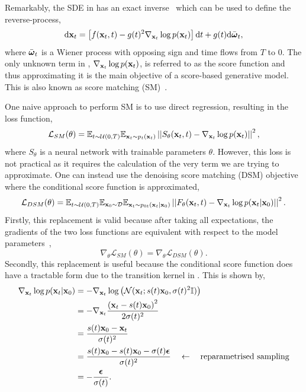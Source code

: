Remarkably, the SDE in  has an exact inverse~\cite{ReversetimeDiffusionEquation} which can be used to define the reverse-process,
\begin{equation}
    \label{eq:reverse_sde}
    \mathrm{d} \mathbf{x}_t = \left[ f(\mathbf{x}_t, t) - g(t)^2 \nabla_{\mathbf{x}_t} \log p(\mathbf{x}_t) \right] \mathrm{d} t + g(t) \mathrm{d} \bar{\boldsymbol{\omega}}_t,
\end{equation}
where $\bar{\boldsymbol{\omega}}_t$ is a Wiener process with opposing sign and time flows from $T$ to $0$.
The only unknown term in , $\nabla_{\mathbf{x}_t} \log p(\mathbf{x}_t)$, is referred to as the score function and thus approximating it is the main objective of a score-based generative model.
This is also known as score matching (SM)~\cite{ScoreMatching}.

One naive approach to perform SM is to use direct regression, resulting in the loss function,
\begin{equation}
    \label{eq:naive_loss}
    \mathcal{L}_{SM}(\theta) =
    \mathbb{E}_{t \sim \mathcal{U}(0, T)}
    \mathbb{E}_{\mathbf{x}_t \sim p_t(\mathbf{x}_t)}
    \left|\left|S_\theta(\mathbf{x}_t, t) - \nabla_{\mathbf{x}_t} \log p(\mathbf{x}_t)\right|\right|^2,
\end{equation}
where $S_\theta$ is a neural network with trainable parameters $\theta$.
However, this loss is not practical as it requires the calculation of the very term we are trying to approximate.
One can instead use the denoising score matching (DSM) objective~\cite{ScoreMatching, SlicedScoreMatching} where the conditional score function is approximated,
\begin{equation}
    \label{eq:denoising_loss}
    \mathcal{L}_{DSM}(\theta) =
    \mathbb{E}_{t \sim \mathcal{U}(0, T)}
    \mathbb{E}_{\mathbf{x}_0 \sim \mathcal{D}}
    \mathbb{E}_{\mathbf{x}_t \sim p_{0t}(\mathbf{x}_t|\mathbf{x}_0)}
    \left|\left|F_\theta(\mathbf{x}_t, t) - \nabla_{\mathbf{x}_t} \log p(\mathbf{x}_t|\mathbf{x}_0)\right|\right|^2.
\end{equation}
Firstly, this replacement is valid because after taking all expectations, the gradients of the two loss functions are equivalent with respect to the model parameters~\cite{ScoreBasedGenerativeModeling},
\begin{equation}
    \nabla_{\theta} \mathcal{L}_{SM}(\theta) = \nabla_{\theta} \mathcal{L}_{DSM}(\theta).
\end{equation}
Secondly, this replacement is useful because the conditional score function does have a tractable form due to the transition kernel in .
This is shown by,
\begin{equation}
    \begin{aligned}
        \label{eq:conditional_score}
        \nabla_{\mathbf{x}_t} \log p(\mathbf{x}_t|\mathbf{x}_0)
        &= -\nabla_{\mathbf{x}_t} \log \left( \mathcal{N}(\mathbf{x}_t; s(t)\mathbf{x}_0, \sigma(t)^2 \mathbb{I}) \right) \\
        &= -\nabla_{\mathbf{x}_t} \frac{\left(\mathbf{x}_t - s(t)\mathbf{x}_0\right)^2}{2\sigma(t)^2} \\
        &= \frac{s(t)\mathbf{x}_0 - \mathbf{x}_t}{\sigma(t)^2} \\
        &= \frac{s(t)\mathbf{x}_0 - s(t)\mathbf{x}_0 - \sigma(t)\boldsymbol{\epsilon}}{\sigma(t)^2} \quad \leftarrow \quad \text{reparametrised sampling} \\
        &= - \frac{\boldsymbol{\epsilon}}{\sigma(t)}.
    \end{aligned}
\end{equation}
